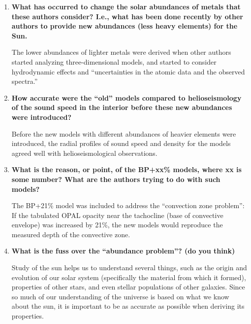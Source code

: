 \documentclass[11pt]{article}
\begin{document}
\begin{enumerate}
    \item \textbf{What has occurred to change the solar abundances
        of metals that these authors consider?
        I.e., what has been done recently by other
        authors to provide new abundances (less heavy elements) for the Sun.}

        The lower abundances of lighter metals were derived when other
        authors started analyzing three-dimensional models,
        and started to consider hydrodynamic effects and
        ``uncertainties in the atomic data and the observed spectra.''

    \item \textbf{How accurate were the ``old'' models compared to helioseismology
        of the sound speed in the interior before these new abundances were
        introduced?}

        Before the new models with different abundances of heavier
        elements were introduced, the radial profiles of sound
        speed and density for the models agreed well with helioseismological
        observations.

    \item \textbf{What is the reason, or point, of the BP+xx\% models,
        where xx is some number? What are the authors trying to do
        with such models?}

        The BP+21\% model was included to address the ``convection zone
        problem'': If the tabulated OPAL opacity near the tachocline
        (base of convective envelope) was increased by 21\%, the new models
        would reproduce the measured depth of the convective zone.

    \item \textbf{What is the fuss over the ``abundance problem''? (do you think)}

        Study of the sun helps us to understand several things, such as
        the origin and evolution of our solar system (specifically the
        material from which it formed), properties of other stars,
        and even stellar populations of other galaxies.
        Since so much of our understanding of the universe is based
        on what we know about the sun, it is important to be as
        accurate as possible when deriving its properties.

\end{enumerate}
\end{document}
